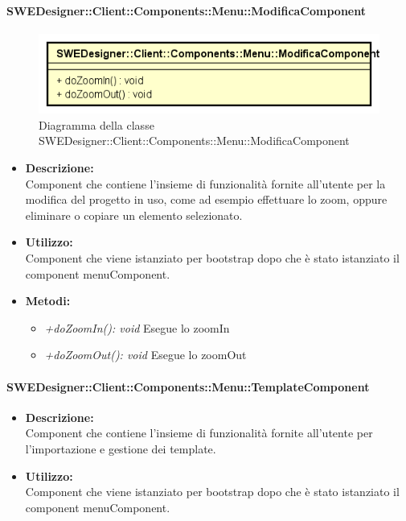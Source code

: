 			\paragraph{SWEDesigner::Client::Components::Menu::ModificaComponent}
			\begin{figure}[h!]
			\centering
			\includegraphics[scale=0.8]{Classi/SWEDesigner__Client__Components__Menu__ModificaComponent.png}
			\caption{Diagramma della classe SWEDesigner::Client::Components::Menu::ModificaComponent}
 			\end{figure}
				\begin{itemize}
          			\item \textbf{Descrizione:}\\
          			Component che contiene l’insieme di funzionalità fornite all’utente per la modifica del progetto in uso, come ad esempio effettuare lo zoom, oppure eliminare o copiare un elemento selezionato.
          			\item \textbf{Utilizzo:}\\
          			Component che viene istanziato per bootstrap dopo che è stato istanziato il component menuComponent.
          			\item \textbf{Metodi:}\\
          			\begin{itemize}
          				\item \emph{+doZoomIn(): void}
          				Esegue lo zoomIn
          				\item \emph{+doZoomOut(): void}
          				Esegue lo zoomOut
          			\end{itemize}
          		\end{itemize}
          	\paragraph{SWEDesigner::Client::Components::Menu::TemplateComponent}
				\begin{itemize}
          			\item \textbf{Descrizione:}\\
          			Component che contiene l’insieme di funzionalità fornite all’utente per l’importazione e gestione dei template.
          			\item \textbf{Utilizzo:}\\
          			Component che viene istanziato per bootstrap dopo che è stato istanziato il component menuComponent.
          		\end{itemize}

